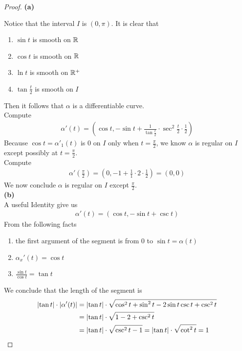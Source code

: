 \documentclass{report}
\begin{document}
\begin{proof}
\textbf{(a)}

Notice that the interval $I$ is  $(0,\pi)$. It is clear that 
\begin{enumerate}[label=(\alph*)]
  \item $\sin t$ is smooth on $\mathbb{R}$
  \item $\cos t$ is smooth on $\mathbb{R}$
  \item $\ln t$ is smooth on $\mathbb{R}^+$
  \item  $\tan \frac{t}{2}$ is smooth on $I$
\end{enumerate}
Then it follows that $\alpha $ is a differentiable curve.\\

Compute 
\begin{align*}
\alpha '(t)=(\cos t,- \sin t + \frac{1}{\tan \frac{t}{2}} \cdot \sec^2 \frac{t}{2}\cdot \frac{1}{2})
\end{align*}
Because $\cos t=\alpha '_1(t)$ is $0$ on  $I$ only when  $t=\frac{\pi}{2}$, we know $\alpha $ is regular on $I$ except possibly at  $t=\frac{\pi}{2}$.\\

Compute 
\begin{align*}
\alpha '(\frac{\pi}{2})=(0,-1+\frac{1}{1}\cdot 2 \cdot \frac{1}{2} )=(0,0)
\end{align*}
We now conclude $\alpha $ is regular on $I$ except  $\frac{\pi}{2}$. \\

\textbf{(b)}\\

A useful Identity give us 
\begin{align*}
\alpha '(t)=(\cos t,-\sin t+ \csc t)
\end{align*}
From the following facts
\begin{enumerate}[label=(\alph*)]
  \item the first argument of the segment is from $0$ to  $\sin t =\alpha (t)$
  \item $\alpha_x'(t)=\cos t$
  \item $\frac{\sin t}{\cos t}=\tan t$
\end{enumerate}
We conclude that the length of the segment is 
\begin{align*}
\left|\tan t\right|\cdot \left|\alpha '(t)\right|&= \left|\tan t\right| \cdot \sqrt{\cos ^2 t + \sin^2 t - 2 \sin t \csc t + \csc ^2 t }\\
&=\left|\tan t\right| \cdot \sqrt{1-2+\csc ^2 t}\\
&=\left|\tan t \right| \cdot \sqrt{\csc ^2 t-1}=\left|\tan t \right| \cdot  \sqrt{\cot ^2 t} =1
\end{align*}



\end{proof}
\end{document}
